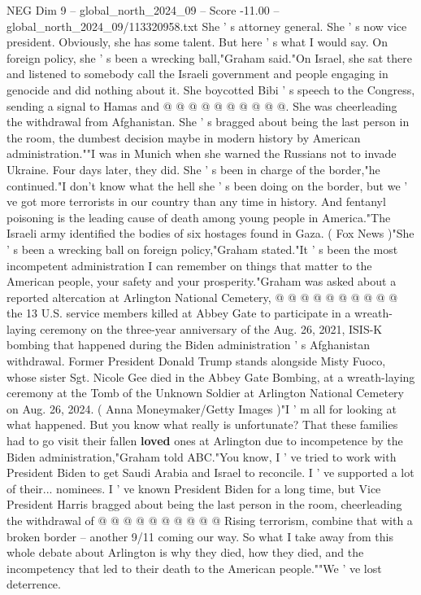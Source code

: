 \begin{textsample}{NEG Dim 9 – global\_north\_2024\_09 – Score -11.00 – global\_north\_2024\_09/113320958.txt}
She ' s attorney general.
She ' s now vice president.
Obviously, she has some talent.
But here ' s what I would say.
On foreign policy, she ' s been a wrecking ball,"Graham said."On Israel, she sat there and listened to somebody call the Israeli government and people engaging in genocide and did nothing about it.
She boycotted Bibi ' s speech to the Congress, sending a signal to Hamas and @ @ @ @ @ @ @ @ @ @.
She was cheerleading the withdrawal from Afghanistan.
She ' s bragged about being the last person in the room, the dumbest decision maybe in modern history by American administration.""I was in Munich when she warned the Russians not to invade Ukraine.
Four days later, they did.
She ' s been in charge of the border,"he continued."I don't know what the hell she ' s been doing on the border, but we ' ve got more terrorists in our country than any time in history.
And fentanyl poisoning is the leading cause of death among young people in America."The Israeli army identified the bodies of six hostages found in Gaza. ( Fox News )"She ' s been a wrecking ball on foreign policy,"Graham stated."It ' s been the most incompetent administration I can remember on things that matter to the American people, your safety and your prosperity."Graham was asked about a reported altercation at Arlington National Cemetery, @ @ @ @ @ @ @ @ @ @ the 13 U.S. service members killed at Abbey Gate to participate in a wreath-laying ceremony on the three-year anniversary of the Aug. 26, 2021, ISIS-K bombing that happened during the Biden administration ' s Afghanistan withdrawal.
Former President Donald Trump stands alongside Misty Fuoco, whose sister Sgt.
Nicole Gee died in the Abbey Gate Bombing, at a wreath-laying ceremony at the Tomb of the Unknown Soldier at Arlington National Cemetery on Aug. 26, 2024. ( Anna Moneymaker/Getty Images )"I ' m all for looking at what happened.
But you know what really is unfortunate?
That these families had to go visit their fallen \textbf{loved} ones at Arlington due to incompetence by the Biden administration,"Graham told ABC."You know, I ' ve tried to work with President Biden to get Saudi Arabia and Israel to reconcile.
I ' ve supported a lot of their... nominees.
I ' ve known President Biden for a long time, but Vice President Harris bragged about being the last person in the room, cheerleading the withdrawal of @ @ @ @ @ @ @ @ @ @ Rising terrorism, combine that with a broken border -- another 9/11 coming our way.
So what I take away from this whole debate about Arlington is why they died, how they died, and the incompetency that led to their death to the American people.""We ' ve lost deterrence.

\end{textsample}
